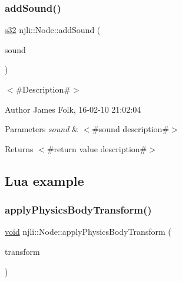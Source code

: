 \begin{DoxyCodeInclude}
\end{DoxyCodeInclude}
\mbox{\label{classnjli_1_1_node_a60e79f386f3d1e3843050a843b4c8a82}} 
\subsubsection{\texorpdfstring{add\+Sound()}{addSound()}}
{\footnotesize\ttfamily \mbox{\hyperlink{_util_8h_aa62c75d314a0d1f37f79c4b73b2292e2}{s32}} njli\+::\+Node\+::add\+Sound (\begin{DoxyParamCaption}\item[{\mbox{\hyperlink{classnjli_1_1_sound}{Sound}} $\ast$}]{sound }\end{DoxyParamCaption})}



$<$\#\+Description\#$>$ 

\begin{DoxyAuthor}{Author}
James Folk, 16-\/02-\/10 21\+:02\+:04
\end{DoxyAuthor}

\begin{DoxyParams}{Parameters}
{\em sound} & $<$\#sound description\#$>$\\
\hline
\end{DoxyParams}
\begin{DoxyReturn}{Returns}
$<$\#return value description\#$>$
\end{DoxyReturn}
\hypertarget{classnjli_1_1_steering_behavior_wander_ex1}{}\subsection{Lua example}\label{classnjli_1_1_steering_behavior_wander_ex1}

\begin{DoxyCodeInclude}
\end{DoxyCodeInclude}
\mbox{\label{classnjli_1_1_node_affbb98fea9966349be743de38256e355}} 
\subsubsection{\texorpdfstring{apply\+Physics\+Body\+Transform()}{applyPhysicsBodyTransform()}}
{\footnotesize\ttfamily \mbox{\hyperlink{_thread_8h_af1e856da2e658414cb2456cb6f7ebc66}{void}} njli\+::\+Node\+::apply\+Physics\+Body\+Transform (\begin{DoxyParamCaption}\item[{const bt\+Transform \&}]{transform }\end{DoxyParamCaption})\hspace{0.3cm}{\ttfamily [protected]}}

